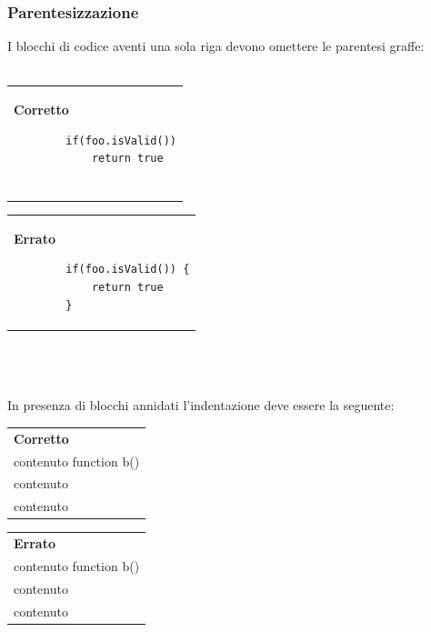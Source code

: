 \subsubsection{Parentesizzazione}

I blocchi di codice aventi una sola riga devono omettere le parentesi graffe:\\\\
\begin{minipage}{0.45\textwidth}
	\begin{tabular}{p{\textwidth}}	
		\textbf{Corretto}
		\begin{lstlisting}
		if(foo.isValid())
			return true
		
		\end{lstlisting}
	\end{tabular}
\end{minipage}
\hfill
\begin{minipage}{0.45\textwidth}
	\begin{tabular}{|p{\textwidth}}		
		\textbf{Errato}
		\begin{lstlisting}
		if(foo.isValid()) {
			return true
		}
		\end{lstlisting}
	\end{tabular}
	
\end{minipage}
\\\\\\
In presenza di blocchi annidati l'indentazione deve essere la seguente:\\

\begin{minipage}{0.45\textwidth}
	\begin{tabular}{p{\textwidth}}	
		\textbf{Corretto}
		\begin{lstlisting}
		class a() {
			\\contenuto		
			function b() {			
			\\contenuto
			}
			
			function c() {
			\\contenuto
			}
		}
		\end{lstlisting}
	\end{tabular}
\end{minipage}
\hfill
\begin{minipage}{0.45\textwidth}
	\begin{tabular}{|p{\textwidth}}
		\textbf{Errato}
		\begin{lstlisting}			
		class a() {
		\\contenuto		
		function b() {
		\\contenuto
		}
		function c() {
		\\contenuto
		}
		}
		\end{lstlisting}
	\end{tabular}
	
\end{minipage}
